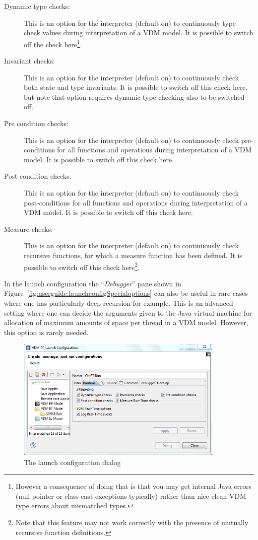\documentclass{overturerepchap}
\begin{document}
\begin{description}
\item[Dynamic type checks:] This is an option for the interpreter (default on)
  to continuously type check  values during interpretation of a VDM model.
  It is possible to switch off the check here\footnote{However a consequence of doing that is that you may get internal Java errors (null pointer or class cast exceptions typically) rather than nice clean VDM type errors about mismatched types.}.
\item[Invariant checks:] This is an option for the interpreter (default on)
  to continuously check both state and type invariants.
  It is possible to switch off
  this check here, but note that option requires dynamic type
  checking also to be switched off.
\item[Pre condition checks:] This is an option for the interpreter (default on)
  to continuously check pre-conditions for all functions and operations
  during interpretation of a VDM model. It is possible to switch off
  this check here.
\item[Post condition checks:] This is an option for the interpreter (default on)
  to continuously check post-conditions for all functions and operations
  during interpretation of a VDM model. It is possible to switch off
  this check here.
\item[Measure checks:] This is an option for the interpreter (default
  on) to continuously check recursive functions, for which a
  measure function has been defined. It is possible to switch off this
  check here\footnote{Note that this feature may not work correctly with the 
presence of mutually recursive function definitions.}.
\end{description}

In the launch
configuration the ``\emph{Debugger}'' pane shown in
Figure~\ref{fig:userguide:launchconfigSpecialoptions} can also be
useful in rare cases where one has particularly deep recursion for
example. This is an advanced setting where one can decide the
arguments given to the Java virtual machine for allocation of maximum
amounts of space per thread in a VDM model. However, this option is
rarely needed.

\begin{figure}[htp]
\begin{center}
  \includegraphics[width=380px]{screenDumps/launchconfigRToptions}
  \caption{The launch configuration dialog}
  \label{fig:userguide:launchconfigRToptions}
\end{center}
\end{figure}
\end{document}

